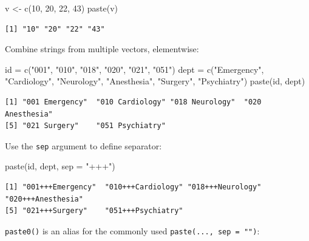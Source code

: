 \documentclass[
]{book}
\newenvironment{Shaded}{\begin{snugshade}}{\end{snugshade}}
\newcommand{\AttributeTok}[1]{\textcolor[rgb]{0.77,0.63,0.00}{#1}}
\newcommand{\DecValTok}[1]{\textcolor[rgb]{0.00,0.00,0.81}{#1}}
\newcommand{\FunctionTok}[1]{\textcolor[rgb]{0.00,0.00,0.00}{#1}}
\newcommand{\NormalTok}[1]{#1}
\newcommand{\OtherTok}[1]{\textcolor[rgb]{0.56,0.35,0.01}{#1}}
\newcommand{\StringTok}[1]{\textcolor[rgb]{0.31,0.60,0.02}{#1}}
\begin{document}
\begin{Shaded}
\begin{Highlighting}[]
\NormalTok{v }\OtherTok{\textless{}{-}} \FunctionTok{c}\NormalTok{(}\DecValTok{10}\NormalTok{, }\DecValTok{20}\NormalTok{, }\DecValTok{22}\NormalTok{, }\DecValTok{43}\NormalTok{)}
\FunctionTok{paste}\NormalTok{(v)}
\end{Highlighting}
\end{Shaded}

\begin{verbatim}
[1] "10" "20" "22" "43"
\end{verbatim}

Combine strings from multiple vectors, elementwise:

\begin{Shaded}
\begin{Highlighting}[]
\NormalTok{id }\OtherTok{=} \FunctionTok{c}\NormalTok{(}\StringTok{"001"}\NormalTok{, }\StringTok{"010"}\NormalTok{, }\StringTok{"018"}\NormalTok{, }\StringTok{"020"}\NormalTok{, }\StringTok{"021"}\NormalTok{, }\StringTok{"051"}\NormalTok{)}
\NormalTok{dept }\OtherTok{=} \FunctionTok{c}\NormalTok{(}\StringTok{"Emergency"}\NormalTok{, }\StringTok{"Cardiology"}\NormalTok{, }\StringTok{"Neurology"}\NormalTok{,}
         \StringTok{"Anesthesia"}\NormalTok{, }\StringTok{"Surgery"}\NormalTok{, }\StringTok{"Psychiatry"}\NormalTok{)}
\FunctionTok{paste}\NormalTok{(id, dept)}
\end{Highlighting}
\end{Shaded}

\begin{verbatim}
[1] "001 Emergency"  "010 Cardiology" "018 Neurology"  "020 Anesthesia"
[5] "021 Surgery"    "051 Psychiatry"
\end{verbatim}

Use the \texttt{sep} argument to define separator:

\begin{Shaded}
\begin{Highlighting}[]
\FunctionTok{paste}\NormalTok{(id, dept, }\AttributeTok{sep =} \StringTok{"+++"}\NormalTok{)}
\end{Highlighting}
\end{Shaded}

\begin{verbatim}
[1] "001+++Emergency"  "010+++Cardiology" "018+++Neurology"  "020+++Anesthesia"
[5] "021+++Surgery"    "051+++Psychiatry"
\end{verbatim}

\texttt{paste0()} is an alias for the commonly used \texttt{paste(...,\ sep\ =\ "")}:
\end{document}
